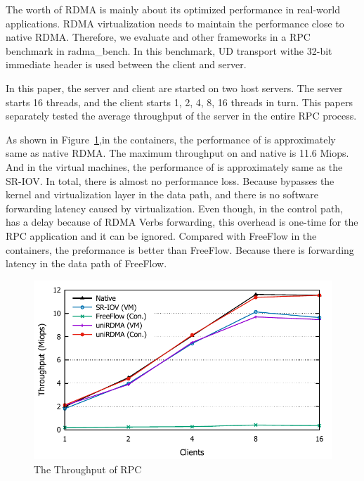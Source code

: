 The worth of RDMA is mainly about its optimized performance in real-world applications. RDMA virtualization needs to maintain the performance close to native RDMA. Therefore, we evaluate \sys and other frameworks in a RPC benchmark in radma\_bench\cite{rbench}. In this benchmark, UD transport withe 32-bit immediate header is used between the client and server.

In this paper, the server and client are started on two host servers. The server starts 16 threads, and the client starts 1, 2, 4, 8, 16 threads in turn. This papers separately tested the average throughput of the server in the entire RPC process.

As shown in Figure~\ref{fig:rpc},in the containers, the performance of \sys is approximately same as native RDMA. The
maximum throughput on \sys and native is 11.6 Miops. And in the virtual machines, the performance of \sys is approximately same as the SR-IOV. In total, there is almost no performance loss. Because \sys bypasses the kernel and virtualization layer in the data path, and there is no software forwarding latency caused by virtualization. Even though, in the control path, \sys has a delay because of RDMA Verbs forwarding, this overhead is one-time for the RPC application and it can be ignored. Compared with FreeFlow in the containers, the preformance \sys is better than FreeFlow. Because there is forwarding latency in the data path of FreeFlow.

\begin{figure}[!ht]
	\centering
	\includegraphics[width=1.0\linewidth]{images/rpc.pdf}
	\caption{The Throughput of RPC}
	\label{fig:rpc}
\end{figure}



